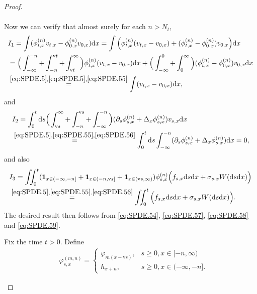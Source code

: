 \documentclass[12pt,a4paper]{amsart}
\numberwithin{equation}{section}
\theoremstyle{plain}
\theoremstyle{remark}
\newenvironment{proof*}[1][\proofname]{
	\renewcommand\qedsymbol{\rule{3mm}{3mm}}
	\begin{proof}[#1]}{\end{proof}}
\begin{document}
\begin{proof}
\begin{proof*}
\begin{align}
\end{align}
	Now we can verify that almost surely for each $n > N_t$,
\begin{align} 
& I_1 
=  \int (\phi^{(n)}_{t,x} v_{t,x} - \phi^{(n)}_{0,x}v_{0,x}) \mathrm dx
= \int \Big( \phi^{(n)}_{t,x} ( v_{t,x} - v_{0,x})  + (\phi^{(n)}_{t,x} - \phi^{(n)}_{0,x}) v_{0,x} \Big)\mathrm dx
 \\ & =\Big(\int_{-\infty}^{-n} + \int_{-n}^{\mathrm vt} + \int_{\mathrm vt}^\infty \Big)  \phi^{(n)}_{t,x} ( v_{t,x} - v_{0,x}) \mathrm dx +\Big(\int_{-\infty}^0 + \int_0^\infty \Big)   (\phi^{(n)}_{t,x} - \phi^{(n)}_{0,x}) v_{0,x} \mathrm dx
\\\label{eq:SPDE.57}&\overset{\eqref{eq:SPDE.5}, \eqref{eq:SPDE.5},\eqref{eq:SPDE.55}}= \int (v_{t,x} - v_{0,x})\mathrm dx,
\end{align}
and 
\begin{align} 
& I_2 =  \int_0^t \mathrm ds \Big(\int_{\mathrm vs}^\infty + \int_{- n}^{\mathrm vs} + \int_{-\infty}^{-n}\Big) (\partial_s  \phi^{(n)}_{s,x} +\Delta_x  \phi^{(n)}_{s,x})v_{s,x} \mathrm dx  
\\ \label{eq:SPDE.58}& \overset{\eqref{eq:SPDE.5}, \eqref{eq:SPDE.55}, \eqref{eq:SPDE.56}}=  \int_0^t \mathrm ds \int_{-\infty}^{-n} (\partial_s \phi^{(n)}_{s,x} +\Delta_x \phi^{(n)}_{s,x}) \mathrm dx  
= 0,
\end{align}
and also
\begin{align} 
& I_3 
= \iint_0^t (\mathbf 1_{x\in (-\infty, -n]} + \mathbf 1_{x\in (-n,\mathrm vs]} + \mathbf 1_{x\in (\mathrm vs,\infty)}) \phi_{s,x}^{(n)}\Big(f_{s,x}\mathrm ds\mathrm dx + \sigma_{s,x} W(\mathrm ds\mathrm dx)\Big)
\\\label{eq:SPDE.59}& \overset{\eqref{eq:SPDE.5}, \eqref{eq:SPDE.55}, \eqref{eq:SPDE.56}}= \iint_0^t  \Big(f_{s,x}\mathrm ds\mathrm dx + \sigma_{s,x} W(\mathrm ds\mathrm dx)\Big).
\end{align}
The desired result then follows from \eqref{eq:SPDE.54}, \eqref{eq:SPDE.57}, \eqref{eq:SPDE.58} and \eqref{eq:SPDE.59}.
\end{proof*}
\begin{proof*}
	Fix the time $t>0$. Define
\begin{align} 
& \varphi_{s,x}^{(m,n)} = 
\begin{cases}
\varphi_{m(x-\mathrm vs)}, &s\geq 0, x\in [-n , \infty)\\
h_{x+n}, &s\geq 0, x\in (-\infty, -n].
\end{cases}  
\end{align}

\end{proof*}
\end{proof}
\end{document}
